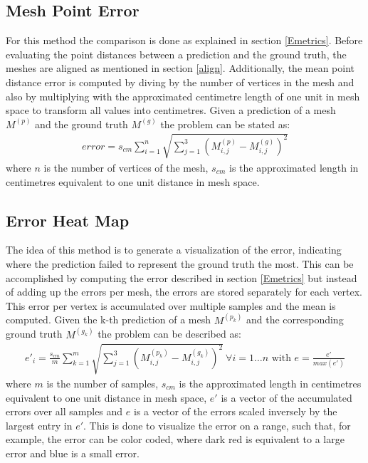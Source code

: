 \subsection{Mesh Point Error} %
\label{mpError}
For this method the comparison is done as explained in section \ref{Emetrics}. Before evaluating the point distances between a prediction and the ground truth, the meshes are aligned as mentioned in section \ref{align}. Additionally, the mean point distance error is computed by diving by the number of vertices in the mesh and also by multiplying with the approximated centimetre length of one unit in mesh space to transform all values into centimetres. Given a prediction of a mesh $M^{(p)}$ and the ground truth $M^{(g)}$ the problem can be stated as:
\begin{gather}
error = s_{cm}\sum_{i=1}^{n} \sqrt{\sum_{j=1}^3(M_{i,j}^{(p)} - M_{i,j}^{(g)})^2}
\end{gather}
where $n$ is the number of vertices of the mesh, $s_{cm}$ is the approximated length in centimetres equivalent to one unit distance in mesh space.
\subsection{Error Heat Map} %
\label{mhError}
The idea of this method is to generate a visualization of the error, indicating where the prediction failed to represent the ground truth the most. This can be accomplished by computing the error described in section \ref{Emetrics} but instead of adding up the errors per mesh, the errors are stored separately for each vertex. This error per vertex is accumulated over multiple samples and the mean is computed. Given the k-th prediction of a mesh $M^{(p_k)}$ and the corresponding ground truth $M^{(g_k)}$ the problem can be described as:
\begin{gather}
e'_{i} = \frac{s_{cm}}{m} \sum_{k=1}^{m} \sqrt{\sum_{j=1}^3(M_{i,j}^{(p_k)} - M_{i,j}^{(g_k)})^2} \  \forall i=1 \dots n \text{ with } e = \frac{e'}{max(e')}
\end{gather}
where $m$ is the number of samples, $s_{cm}$ is the approximated length in centimetres equivalent to one unit distance in mesh space, $e'$ is a vector of the accumulated errors over all samples and $e$ is a vector of the errors scaled inversely by the largest entry in $e'$. This is done to visualize the error on a range, such that, for example, the error can be color coded, where dark red is equivalent to a large error and blue is a small error.
